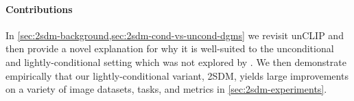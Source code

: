 \paragraph{Contributions} In \cref{sec:2sdm-background,sec:2sdm-cond-vs-uncond-dgms} we revisit unCLIP and then provide a novel explanation for why it is well-suited to the unconditional and lightly-conditional setting which was not explored by \citet{ramesh2022hierarchical}. We then demonstrate empirically that our lightly-conditional variant, 2SDM, yields large improvements on a variety of image datasets, tasks, and metrics in \cref{sec:2sdm-experiments}.











